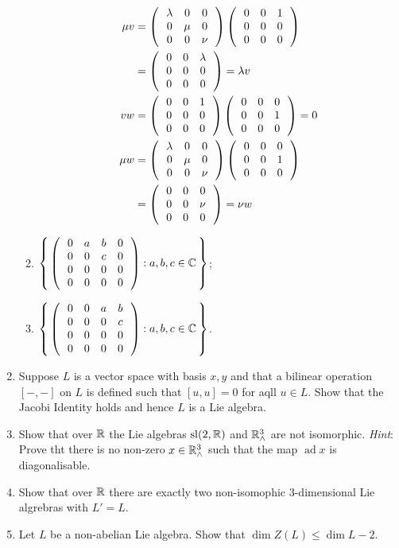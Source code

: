 \documentclass[12pt,a4paper]{report}
\newcommand{\BLUE}[1]{\textcolor{blue}{#1}}
\newcommand{\SL}{\operatorname{sl}}
\newcommand{\AD}{\operatorname{ad}}
\begin{document}
\begin{enumerate}[label=3.\arabic*.]
\begin{enumerate}[label=(\roman*)]
	\BLUE{\begin{align*}
		\mu v &= \left (\,  \begin{array}{c c c} \lambda&0&0 \\ 0 & \mu & 0 \\ 0 & 0 & \nu \end{array}  \,\right )\left (\,  \begin{array}{c c c} 0&0&1 \\ 0 & 0 & 0 \\ 0 & 0 & 0 \end{array}  \,\right ) \\
		&= \left (\,  \begin{array}{c c c} 0&0&\lambda \\ 0 & 0 & 0 \\ 0 & 0 & 0 \end{array}  \,\right ) = \lambda v \\
		v w &= \left (\,  \begin{array}{c c c} 0&0&1 \\ 0 & 0 & 0 \\ 0 & 0 & 0 \end{array}  \,\right )\left (\,  \begin{array}{c c c} 0&0&0 \\ 0 & 0 & 1 \\ 0 & 0 & 0 \end{array}  \,\right ) = 0\\
	\mu w &= \left (\,  \begin{array}{c c c} \lambda&0&0 \\ 0 & \mu & 0 \\ 0 & 0 & \nu \end{array}  \,\right )\left (\,  \begin{array}{c c c} 0&0&0 \\ 0 & 0 & 1 \\ 0 & 0 & 0 \end{array}  \,\right ) \\
	&= \left (\,  \begin{array}{c c c} 0&0&0 \\ 0 & 0 & \nu \\ 0 & 0 & 0 \end{array}  \,\right ) = \nu w
\end{align*}	
	}
	
	\item $\left \{\, \left (\, \begin{array}{cccc}
		0&a&b&0 \\
		0&0&c&0\\
		0&0&0&0\\
		0&0&0&0\\	
	\end{array}
	 \,\right ): a,b,c \in \mathbb{C} \,\right \}$;
	
	\item $\left \{\, \left (\, \begin{array}{cccc}
		0&0&a&b \\
		0&0&0&c\\
		0&0&0&0\\
		0&0&0&0\\	
	\end{array}
	 \,\right ): a,b,c \in \mathbb{C} \,\right \}$.
\end{enumerate}

\item Suppose $L$ is a vector space with basis $x,y$ and that a bilinear operation $[-,-]$ on $L$ is defined such that $[u,u]=0$ for aqll $u \in L$.  Show that the Jacobi Identity holds and hence $L$ is a Lie algebra.

\item Show that over $\mathbb{R}$ the Lie algebras $\SL(2,\R)$ and $\mathbb{R}^3_\wedge$ are not isomorphic.  \textit{Hint}: Prove tht there is no non-zero $x\in \mathbb{R}^3_\wedge$ such that the map $\AD x$ is diagonalisable.

\item Show that over $\mathbb{R}$ there are exactly two non-isomophic 3-dimensional Lie algrebras with $L'=L$.

\item Let $L$ be a non-abelian Lie algebra.  Show that $\dim Z(L) \le \dim L -2$.


\end{enumerate}
\end{document}
